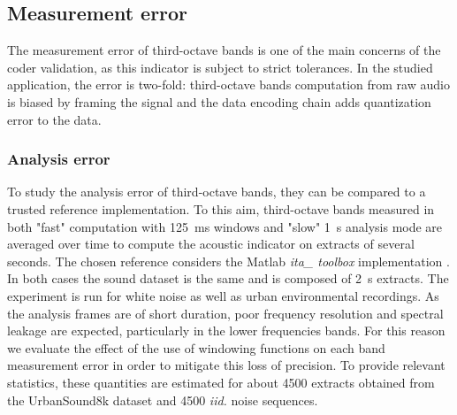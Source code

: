 \documentclass[12pt,times,onecolumn]{article}
\begin{document}
\subsection{Measurement error}
The measurement error of third-octave bands is one of the main concerns of the coder validation, as this indicator is subject to strict tolerances. In the studied application, the error is two-fold: third-octave bands computation from raw audio is biased by framing the signal and the data encoding chain adds quantization error to the data.
\subsubsection{Analysis error}
To study the analysis error of third-octave bands, they can be compared to a trusted reference implementation. To this aim, third-octave bands measured in both "fast" computation with 125~ms windows and "slow" 1~s analysis mode are averaged over time to compute the acoustic indicator on extracts of several seconds. The chosen reference considers the Matlab \textit{ita\_ toolbox} implementation \cite{itatoolbox2017}. In both cases the sound dataset is the same and is composed of 2~s extracts. The experiment is run for white noise as well as urban environmental recordings. As the analysis frames are of short duration, poor frequency resolution and spectral leakage are expected, particularly in the lower frequencies bands. For this reason we evaluate the effect of the use of windowing functions on each band measurement error in order to mitigate this loss of precision. To provide relevant statistics, these quantities are estimated for about 4500 extracts obtained from the UrbanSound8k dataset \cite{salamon2014} and 4500 \textit{iid.} noise sequences.
\end{document}
